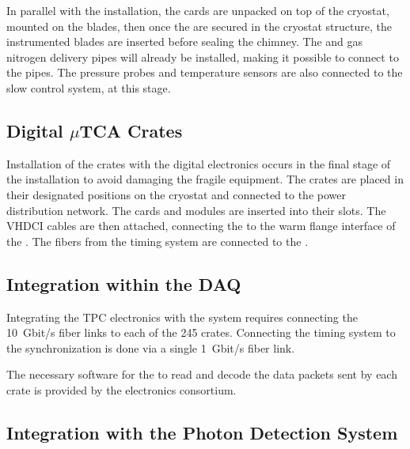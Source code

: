 In parallel with the  installation, the  cards are unpacked on top of the cryostat, %
mounted on the blades, then %
once the  are secured in the cryostat structure, the instrumented blades %
are inserted before sealing the chimney. %
The \lar and gas nitrogen delivery pipes will %
already be installed, making it  possible to connect to the pipes. The pressure probes and temperature sensors are also connected to the slow control system, at this stage.

\subsection{Digital $\mu$TCA Crates}
\label{ssec:dp-tpcelec-install-utca}

Installation of the  crates with the digital electronics occurs in the final stage of the  installation to avoid damaging the fragile equipment. The crates are placed in their designated positions on the cryostat and connected to the power distribution network. The  cards and  modules are inserted into their slots. The VHDCI cables are then attached, connecting the   to the warm flange interface of the .  The fibers from the timing system are connected to the . 

\subsection{Integration within the DAQ}
\label{ssec:dp-tpcelec-install-daq}

Integrating the \dual TPC electronics with the  system requires connecting the \SI{10}{Gbit/s} fiber links to each of the \num{245}  crates. Connecting the timing system to the synchronization  is done via a single \SI{1}{Gbit/s} fiber link. 

The necessary software for the  to read and decode the data packets sent by each  crate is provided by the electronics consortium.  

\subsection{Integration with the Photon Detection System}
\label{ssec:dp-tpcelec-install-pmt}

